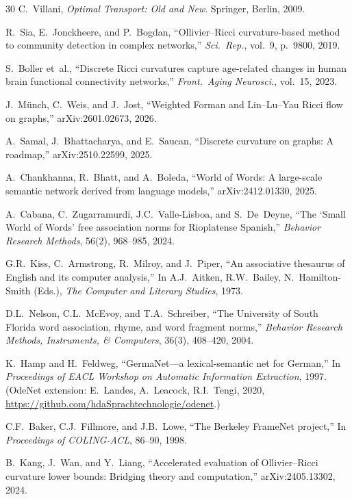 \documentclass[11pt,a4paper]{article}
\begin{document}
\begin{thebibliography}{30}
C.~Villani,
\emph{Optimal Transport: Old and New}.
Springer, Berlin, 2009.

R.~Sia, E.~Jonckheere, and P.~Bogdan,
``Ollivier--Ricci curvature-based method to community detection in complex
networks,'' \emph{Sci.~Rep.}, vol.~9, p.~9800, 2019.

S.~Boller et~al.,
``Discrete Ricci curvatures capture age-related changes in human brain
functional connectivity networks,''
\emph{Front.\ Aging Neurosci.}, vol.~15, 2023.

J.~M\"unch, C.~Weis, and J.~Jost,
``Weighted Forman and Lin--Lu--Yau Ricci flow on graphs,''
arXiv:2601.02673, 2026.

A.~Samal, J.~Bhattacharya, and E.~Saucan,
``Discrete curvature on graphs: A roadmap,''
arXiv:2510.22599, 2025.

A.~Chankhanna, R.~Bhatt, and A.~Boleda,
``World of Words: A large-scale semantic network derived from language models,''
arXiv:2412.01330, 2025.

A.~Cabana, C.~Zugarramurdi, J.C.~Valle-Lisboa, and S.~De~Deyne,
``The `Small World of Words' free association norms for Rioplatense Spanish,''
\textit{Behavior Research Methods}, 56(2), 968--985, 2024.

G.R.~Kiss, C.~Armstrong, R.~Milroy, and J.~Piper,
``An associative thesaurus of English and its computer analysis,''
In A.J.~Aitken, R.W.~Bailey, N.~Hamilton-Smith (Eds.), \textit{The Computer and Literary Studies}, 1973.

D.L.~Nelson, C.L.~McEvoy, and T.A.~Schreiber,
``The University of South Florida word association, rhyme, and word fragment norms,''
\textit{Behavior Research Methods, Instruments, \& Computers}, 36(3), 408--420, 2004.

K.~Hamp and H.~Feldweg,
``GermaNet---a lexical-semantic net for German,''
In \textit{Proceedings of EACL Workshop on Automatic Information Extraction}, 1997.
(OdeNet extension: E.~Landes, A.~Leacock, R.I.~Tengi, 2020, \url{https://github.com/hdaSprachtechnologie/odenet}.)

C.F.~Baker, C.J.~Fillmore, and J.B.~Lowe,
``The Berkeley FrameNet project,''
In \textit{Proceedings of COLING-ACL}, 86--90, 1998.

B.~Kang, J.~Wan, and Y.~Liang,
``Accelerated evaluation of Ollivier--Ricci curvature lower bounds: Bridging theory and computation,''
arXiv:2405.13302, 2024.


\end{thebibliography}
\end{document}
